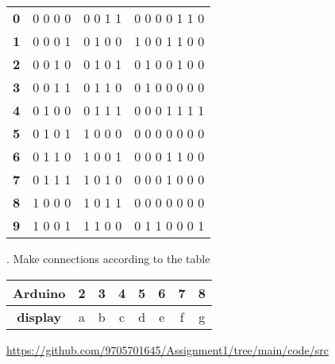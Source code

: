\documentclass{article}
\begin{document}
\begin{tableofcontents}
\begin{tabular}{|c||c||c||c|}
\hline
\textbf{0} & {0  0  0 0} & {0  0  1 1} & {0 0 0 0 1 1 0}\\
\textbf{1} & {0  0  0 1} & {0  1  0 0} & {1 0 0 1 1 0 0}\\
\textbf{2} & {0  0  1 0} & {0  1  0 1} & {0 1 0 0 1 0 0}\\
\textbf{3} & {0  0  1 1} & {0  1  1 0} & {0 1 0 0 0 0 0}\\
\textbf{4} & {0  1  0 0} & {0  1  1 1} & {0 0 0 1 1 1 1}\\
\textbf{5} & {0  1  0 1} & {1  0  0 0} & {0 0 0 0 0 0 0}\\
\textbf{6} & {0  1  1 0} & {1  0  0 1} & {0 0 0 1 1 0 0}\\
\textbf{7} & {0  1  1 1} & {1  0  1 0} & {0 0 0 1 0 0 0}\\
\textbf{8} & {1  0  0 0} & {1  0  1 1} & {0 0 0 0 0 0 0}\\
\textbf{9} & {1  0  0 1} & {1  1  0 0} & {0 1 1 0 0 0 1}\\
\hline

\end{tabular}
\newline
{}. Make connections according to the table\\
\newline
\begin{tabular}{|c||c||c||c||c||c||c||c|}
\hline
\textbf{Arduino} & 2 & 3 & 4 & 5 & 6 & 7 & 8\\
\hline
\textbf{display} & {a} & {b} & {c} & {d} & {e} & {f} & {g}\\
\hline
\end{tabular}
\newline
\end{tableofcontents}
\newline
\vspace{1cm}
\href{https://github.com/9705701645/Assignment1/tree/main/code/src}{https://github.com/9705701645/Assignment1/tree/main/code/src}
\end{document}
